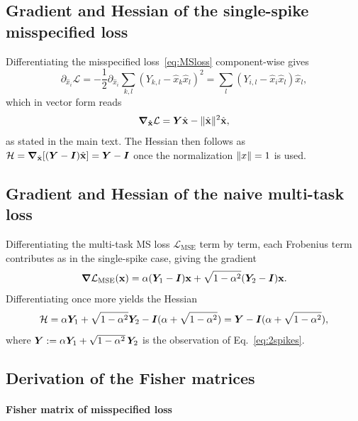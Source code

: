 \documentclass[11pt]{article}
\begin{document}
\begin{rem}
\subsection{Gradient and Hessian of the single-spike misspecified loss}\label{adix:spectral-grad}
Differentiating the misspecified loss~\eqref{eq:MSloss} component-wise gives
\begin{equation}
    \partial_{\hat{x}_i} \mathcal{L} = -\frac{1}{2} \partial_{\hat{x}_i}\sum_{k,l} (Y_{k,l} - \hat{x}_k \hat{x}_l)^2 = \sum_{l}  (Y_{i,l} - \hat{x}_i \hat{x}_l)\hat{x}_l ,
\end{equation}
which in vector form reads
\begin{equation}
    \boldsymbol{\mathbf{\nabla_{\hat{\boldsymbol{\mathbf{x}}}}}}\mathcal{L} = \bm{Y} \hat{\boldsymbol{\mathbf{x}}} -  \|\hat{\boldsymbol{\mathbf{x}}} \|^2 \hat{\boldsymbol{\mathbf{x}}},
\end{equation}
as stated in the main text. The Hessian then follows as $\mathcal{H} = \boldsymbol{\mathbf{\nabla}}_{\hat{\boldsymbol{\mathbf{x}}}} [(\bm{Y}  -\bm{I}) \hat{\boldsymbol{\mathbf{x}}}] = \bm{Y}  -\bm{I}$ once the normalization $ \|x \|=1$ is used.

\subsection{Gradient and Hessian of the naive multi-task loss}\label{adix:naive-grad}
Differentiating the multi-task MS loss $\mathcal{L}_{\mathrm{MSE}}$ term by term, each Frobenius term contributes as in the single-spike case, giving the gradient
\begin{equation}
    \boldsymbol{\mathbf{ \nabla}} \mathcal{L}_{\mathrm{MSE}}(\boldsymbol{\mathbf{x}}) = \alpha (\bm{Y}_1 - \bm{I})\boldsymbol{\mathbf{x}} + \sqrt{1-\alpha^2} (\bm{Y}_2 - \bm{I})\boldsymbol{\mathbf{x}} .
\end{equation}
Differentiating once more yields the Hessian
\begin{equation}
    \mathcal{H} = \alpha \bm{Y}_1 + \sqrt{1-\alpha^2} \bm{Y}_2 - \bm{I} ( \alpha + \sqrt{1-\alpha^2}) = \bm{Y} - \bm{I} ( \alpha + \sqrt{1-\alpha^2}),
\end{equation}
where $\bm{Y} := \alpha \bm{Y}_1 + \sqrt{1-\alpha^2}\,\bm{Y}_2$ is the observation of Eq.~\eqref{eq:2spikes}.

\subsection{Derivation of the Fisher matrices}\label{adix:fisher}

\paragraph{Fisher matrix of misspecified loss}


\end{rem}
\end{document}
